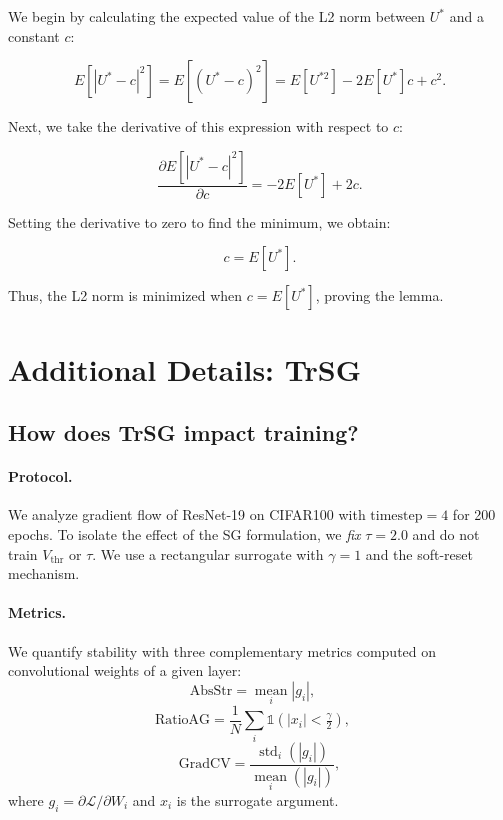 \medskip

We begin by calculating the expected value of the L2 norm between \( U^{*} \) and a constant \( c \):

\begin{equation}
    E[|U^{*} - c|^{2}] = E[(U^{*} - c)^{2}] = E[U^{*2}] - 2E[U^{*}]c + c^2.
\end{equation}

Next, we take the derivative of this expression with respect to \( c \):

\begin{equation}
    \frac{\partial E[|U^{*} - c|^{2}]}{\partial c} = -2E[U^{*}] + 2c.
\end{equation}

Setting the derivative to zero to find the minimum, we obtain:

\begin{equation}
    c = E[U^{*}].
\end{equation}

Thus, the L2 norm is minimized when \( c = E[U^{*}] \), proving the lemma.


\section{Additional Details: TrSG}
\label{sec:appendix_trsg}

\subsection{How does TrSG impact training?}
\label{subsec:how_trsg_impacts_training}

\paragraph{Protocol.}
We analyze gradient flow of ResNet-19 on CIFAR100 with $\text{timestep}{=}4$ for 200 epochs. To isolate the effect of the SG formulation, we \emph{fix} $\tau{=}2.0$ and do not train $V_{\text{thr}}$ or $\tau$. We use a rectangular surrogate with $\gamma{=}1$ and the soft-reset mechanism.

\paragraph{Metrics.}
We quantify stability with three complementary metrics computed on convolutional weights of a given layer:
\[
\text{AbsStr}=\operatorname*{mean}_i |g_i|,\quad
\]
\[
\text{RatioAG}=\frac{1}{N}\sum_i \mathds{1}\!\left(|x_i|<\tfrac{\gamma}{2}\right),\quad
\]
\[
\text{GradCV}=\frac{\operatorname{std}_i(|g_i|)}{\operatorname*{mean}_i(|g_i|)},
\]
where $g_i=\partial \mathcal{L}/\partial W_i$ and $x_i$ is the surrogate argument. 

